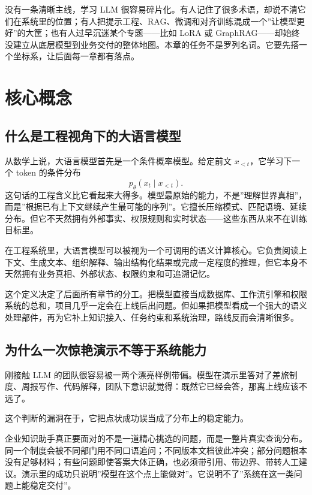 没有一条清晰主线，学习 LLM 很容易碎片化。有人记住了很多术语，却说不清它们在系统里的位置；有人把提示工程、RAG、微调和对齐训练混成一个”让模型更好”的大筐；也有人过早沉迷某个专题——比如 LoRA 或 GraphRAG——却始终没建立从底层模型到业务交付的整体地图。本章的任务不是罗列名词。它要先搭一个坐标系，让后面每一章都有落点。

\section{核心概念}
\subsection{什么是工程视角下的大语言模型}
从数学上说，大语言模型首先是一个条件概率模型。给定前文 \(x_{<t}\)，它学习下一个 token 的条件分布
\[
p_\theta(x_t \mid x_{<t}).
\]
这句话的工程含义比它看起来大得多。模型最原始的能力，不是”理解世界真相”，而是”根据已有上下文继续产生最可能的序列”。它擅长压缩模式、匹配语境、延续分布。但它不天然拥有外部事实、权限规则和实时状态——这些东西从来不在训练目标里。

\begin{definition}
在工程系统里，大语言模型可以被视为一个可调用的语义计算核心。它负责阅读上下文、生成文本、组织解释、输出结构化结果或完成一定程度的推理，但它本身不天然拥有业务真相、外部状态、权限约束和可追溯记忆。
\end{definition}

这个定义决定了后面所有章节的分工。把模型直接当成数据库、工作流引擎和权限系统的总和，项目几乎一定会在上线后出问题。但如果把模型看成一个强大的语义处理部件，再为它补上知识接入、任务约束和系统治理，路线反而会清晰很多。

\subsection{为什么一次惊艳演示不等于系统能力}
刚接触 LLM 的团队很容易被一两个漂亮样例带偏。模型在演示里答对了差旅制度、周报写作、代码解释，团队下意识就觉得：既然它已经会答，那离上线应该不远了。

这个判断的漏洞在于，它把点状成功误当成了分布上的稳定能力。

企业知识助手真正要面对的不是一道精心挑选的问题，而是一整片真实查询分布。同一个制度会被不同部门用不同口语追问；不同版本文档彼此冲突；部分问题根本没有足够材料；有些问题即使答案大体正确，也必须带引用、带边界、带转人工建议。演示里的成功只说明”模型在这个点上能做对”。它说明不了”系统在这一类问题上能稳定交付”。

